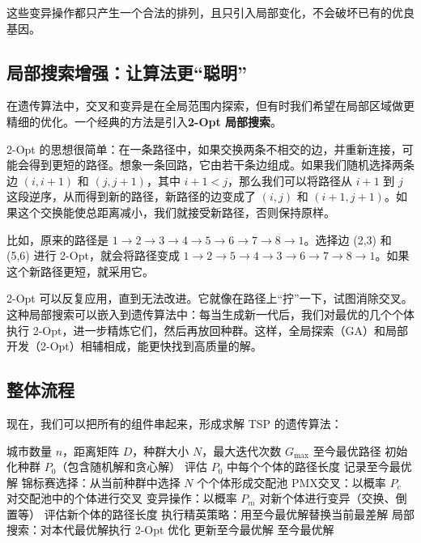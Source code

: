 \documentclass[lang=cn,zihao=-4,a4paper,fontset=windows]{beautybook}
\begin{document}
这些变异操作都只产生一个合法的排列，且只引入局部变化，不会破坏已有的优良基因。

\subsection{局部搜索增强：让算法更“聪明”}

在遗传算法中，交叉和变异是在全局范围内探索，但有时我们希望在局部区域做更精细的优化。一个经典的方法是引入\textbf{2-Opt 局部搜索}。

2-Opt 的思想很简单：在一条路径中，如果交换两条不相交的边，并重新连接，可能会得到更短的路径。想象一条回路，它由若干条边组成。如果我们随机选择两条边 $(i, i+1)$ 和 $(j, j+1)$，其中 $i+1 < j$，那么我们可以将路径从 $i+1$ 到 $j$ 这段逆序，从而得到新的路径，新路径的边变成了 $(i, j)$ 和 $(i+1, j+1)$。如果这个交换能使总距离减小，我们就接受新路径，否则保持原样。

比如，原来的路径是 $1 \to 2 \to 3 \to 4 \to 5 \to 6 \to 7 \to 8 \to 1$。选择边 (2,3) 和 (5,6) 进行 2-Opt，就会将路径变成 $1 \to 2 \to 5 \to 4 \to 3 \to 6 \to 7 \to 8 \to 1$。如果这个新路径更短，就采用它。

2-Opt 可以反复应用，直到无法改进。它就像在路径上“拧”一下，试图消除交叉。这种局部搜索可以嵌入到遗传算法中：每当生成新一代后，我们对最优的几个个体执行 2-Opt，进一步精炼它们，然后再放回种群。这样，全局探索（GA）和局部开发（2-Opt）相辅相成，能更快找到高质量的解。

\subsection{整体流程}

现在，我们可以把所有的组件串起来，形成求解 TSP 的遗传算法：

\begin{algorithm}[H]
\caption{GA for TSP with Local Search}
\begin{algorithmic}[1]
\REQUIRE 城市数量 $n$，距离矩阵 $D$，种群大小 $N$，最大迭代次数 $G_{\max}$
\ENSURE 至今最优路径
\STATE 初始化种群 $P_0$（包含随机解和贪心解）
\STATE 评估 $P_0$ 中每个个体的路径长度
\STATE 记录至今最优解
    \STATE 锦标赛选择：从当前种群中选择 $N$ 个个体形成交配池
    \STATE PMX交叉：以概率 $P_c$ 对交配池中的个体进行交叉
    \STATE 变异操作：以概率 $P_m$ 对新个体进行变异（交换、倒置等）
    \STATE 评估新个体的路径长度
    \STATE 执行精英策略：用至今最优解替换当前最差解
    \STATE 局部搜索：对本代最优解执行 2-Opt 优化
    \STATE 更新至今最优解
\ENDFOR
\RETURN 至今最优解
\end{algorithmic}
\end{algorithm}
\end{document}
